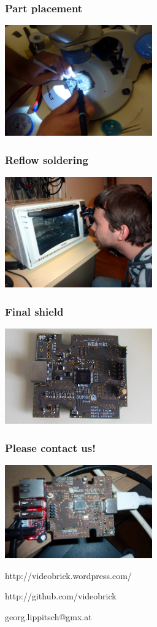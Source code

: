 \documentclass{beamer}
\begin{document}
\begin{frame} %

  \frametitle{Part placement}
  \begin{center}
    \includegraphics[width=240px]{microscope.jpg}
  \end{center}

\end{frame}

\begin{frame} %

  \frametitle{Reflow soldering}
  \begin{center}
    \includegraphics[width=240px]{soldering.jpg}
  \end{center}

\end{frame}

\begin{frame} %

  \frametitle{Final shield}
  \begin{center}
    \includegraphics[width=240px]{shield.jpg}
  \end{center}

\end{frame}

\begin{frame} %
  \frametitle{Please contact us!}

  \begin{center}
    \includegraphics[width=240px]{vbrick.jpg}
  \end{center}

  http://videobrick.wordpress.com/

  http://github.com/videobrick

  georg.lippitsch@gmx.at
\end{frame}
\end{document}
